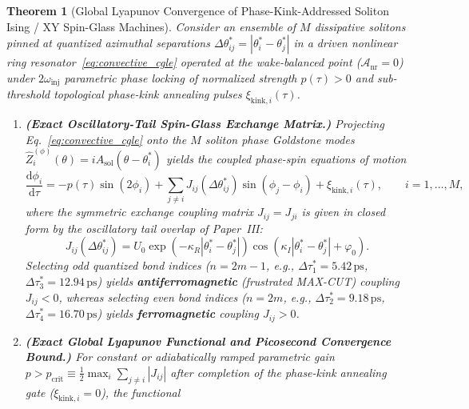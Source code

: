 \documentclass[11pt,letterpaper]{article}
\newtheorem{theorem}{Theorem}
\begin{document}
\begin{theorem}[Global Lyapunov Convergence of Phase-Kink-Addressed Soliton Ising / XY Spin-Glass Machines]
\label{thm:ising_lyapunov}
Consider an ensemble of $M$ dissipative solitons pinned at quantized azimuthal separations $\Delta\theta_{ij}^* = |\theta_i^* - \theta_j^*|$ in a driven nonlinear ring resonator~\eqref{eq:convective_cgle} operated at the wake-balanced point ($\mathcal{A}_{\mathrm{nr}} = 0$) under $2\omega_{\mathrm{inj}}$ parametric phase locking of normalized strength $p(\tau) > 0$ and sub-threshold topological phase-kink annealing pulses $\xi_{\mathrm{kink},i}(\tau)$.
\begin{enumerate}
    \item[(a)] \textbf{(Exact Oscillatory-Tail Spin-Glass Exchange Matrix.)} Projecting Eq.~\eqref{eq:convective_cgle} onto the $M$ soliton phase Goldstone modes $\hat{Z}_i^{(\phi)}(\theta) = i A_{\mathrm{sol}}(\theta - \theta_i^*)$ yields the coupled phase-spin equations of motion
    \begin{equation}
    \frac{\mathrm{d}\phi_i}{\mathrm{d}\tau} = -p(\tau)\sin(2\phi_i) + \sum_{j \neq i} J_{ij}\!\left(\Delta\theta_{ij}^*\right)\sin(\phi_j - \phi_i) + \xi_{\mathrm{kink},i}(\tau), \qquad i = 1, \dots, M,
    \label{eq:thm2_phase_eom}
    \end{equation}
    where the symmetric exchange coupling matrix $J_{ij} = J_{ji}$ is given in closed form by the oscillatory tail overlap of Paper~III:
    \begin{equation}
    J_{ij}\!\left(\Delta\theta_{ij}^*\right) = U_0 \exp\!\left(-\kappa_R |\theta_i^* - \theta_j^*|\right)\cos\!\left(\kappa_I |\theta_i^* - \theta_j^*| + \varphi_0\right).
    \label{eq:thm2_Jij}
    \end{equation}
    Selecting odd quantized bond indices ($n = 2m - 1$, e.g., $\Delta\tau_1^* = 5.42\,\mathrm{ps}$, $\Delta\tau_3^* = 12.94\,\mathrm{ps}$) yields \textbf{antiferromagnetic} (frustrated MAX-CUT) coupling $J_{ij} < 0$, whereas selecting even bond indices ($n = 2m$, e.g., $\Delta\tau_2^* = 9.18\,\mathrm{ps}$, $\Delta\tau_4^* = 16.70\,\mathrm{ps}$) yields \textbf{ferromagnetic} coupling $J_{ij} > 0$.
    \item[(b)] \textbf{(Exact Global Lyapunov Functional and Picosecond Convergence Bound.)} For constant or adiabatically ramped parametric gain $p > p_{\mathrm{crit}} \equiv \frac{1}{2}\max_i \sum_{j\neq i}|J_{ij}|$ after completion of the phase-kink annealing gate ($\xi_{\mathrm{kink},i} = 0$), the functional
    \begin{equation}

\end{equation}
\end{enumerate}
\end{theorem}
\end{document}
